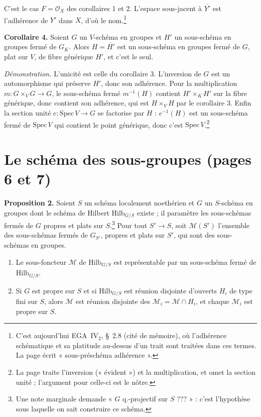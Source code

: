 \documentclass[11pt,a4paper]{article}
\begin{document}
C'est le cas $F = \mathcal{O}_X$ des corollaires 1 et 2. L'espace sous-jacent
à $\overline{Y'}$ est l'adhérence de $Y'$ dans $X$, d'où le
nom.\footnote{C'est aujourd'hui EGA~IV$_{2}$, §~2.8 (cité de mémoire), où
l'adhérence schématique et sa platitude au-dessus d'un trait sont traitées
dans ces termes. La page écrit « sous-préschéma adhérence ».}

\textbf{Corollaire 4.} Soient $G$ un $V$-schéma en groupes et $H'$ un
sous-schéma en groupes fermé de $G_K$. Alors $H = \overline{H'}$ est un
sous-schéma en groupes fermé de $G$, plat sur $V$, de fibre générique $H'$, et
c'est le seul.

\emph{Démonstration.} L'unicité est celle du corollaire 3. L'inversion de $G$
est un automorphisme qui préserve $H'$, donc son adhérence. Pour la
multiplication $m \colon G \times_V G \to G$, le sous-schéma fermé
$m^{-1}(H)$ contient $H' \times_K H'$ sur la fibre générique, donc contient son
adhérence, qui est $H \times_V H$ par le corollaire 3. Enfin la section unité
$e \colon \mathrm{Spec}\, V \to G$ se factorise par $H$ : $e^{-1}(H)$ est un
sous-schéma fermé de $\mathrm{Spec}\, V$ qui contient le point générique, donc
c'est $\mathrm{Spec}\, V$.\footnote{La page traite l'inversion (« évident ») et
la multiplication, et omet la section unité ; l'argument pour celle-ci est le
nôtre.}

\section*{Le schéma des sous-groupes (pages 6 et 7)}

\textbf{Proposition 2.} Soient $S$ un schéma localement noethérien et $G$ un
$S$-schéma en groupes dont le schéma de Hilbert $\mathrm{Hilb}_{G/S}$ existe ;
il paramètre les sous-schémas fermés de $G$ propres et plats sur
$S$.\footnote{Une note marginale demande « $G$ q.-projectif sur $S$ ??? » :
c'est l'hypothèse sous laquelle on sait construire ce schéma.} Pour tout
$S' \to S$, soit $\mathcal{M}(S')$ l'ensemble des sous-schémas fermés de
$G_{S'}$, propres et plats sur $S'$, qui sont des sous-schémas en groupes.
\begin{enumerate}
\item[(a)] Le sous-foncteur $\mathcal{M}$ de $\mathrm{Hilb}_{G/S}$ est
représentable par un sous-schéma fermé de $\mathrm{Hilb}_{G/S}$.
\item[(b)] Si $G$ est propre sur $S$ et si $\mathrm{Hilb}_{G/S}$ est réunion
disjointe d'ouverts $H_i$ de type fini sur $S$, alors $\mathcal{M}$ est réunion
disjointe des $\mathcal{M}_i = \mathcal{M} \cap H_i$, et chaque
$\mathcal{M}_i$ est propre sur $S$.
\end{enumerate}
\end{document}
